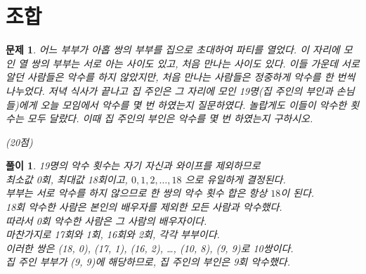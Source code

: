 \documentclass[12pt,a4paper]{article}
\theoremstyle{test_form}
\newtheorem{problem}{문제}[section]
\newtheorem*{solution}{풀이}
\begin{document}
\section{조합}

\begin{problem}
어느 부부가 아홉 쌍의 부부를 집으로 초대하여 파티를 열었다. 이 자리에 모인 열 쌍의 부부는 서로 아는 사이도 있고, 처음 만나는 사이도 있다. 이들 가운데 서로 알던 사람들은 악수를 하지 않았지만, 처음 만나는 사람들은 정중하게 악수를 한 번씩 나누었다. 저녁 식사가 끝나고 집 주인은 그 자리에 모인 19명(집 주인의 부인과 손님들)에게 오늘 모임에서 악수를 몇 번 하였는지 질문하였다. 놀랍게도 이들이 악수한 횟수는 모두 달랐다. 이때 집 주인의 부인은 악수를 몇 번 하였는지 구하시오.
\begin{flushright}(20점)\end{flushright}
\end{problem}


\begin{solution}
    \setlength{\parindent}{0pt}

    19명의 악수 횟수는 자기 자신과 와이프를 제외하므로 \\
    최소값 0회, 최대값 18회이고, \(0,1,2,\dots,18\) 으로 유일하게 결정된다.\\
    부부는 서로 악수를 하지 않으므로 한 쌍의 악수 횟수 합은 항상 \(18\)이 된다.  \\

    18회 악수한 사람은 본인의 배우자를 제외한 모든 사람과 악수했다.  \\
    따라서 0회 악수한 사람은 그 사람의 배우자이다.  \\
    마찬가지로 17회와 1회, 16회와 2회,  각각 부부이다. \\

    이러한 쌍은 (18, 0), (17, 1), (16, 2), \ldots, (10, 8), (9, 9)로 10쌍이다. \\
    집 주인 부부가 (9, 9)에 해당하므로, 집 주인의 부인은 9회 악수했다.


    \begin{center}
    \end{center}
    \end{solution}
    
\end{document}
